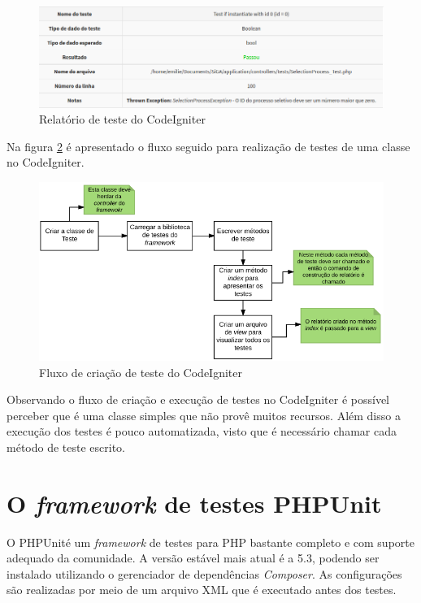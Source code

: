 \begin{figure}[!h]
\centering
\includegraphics[scale=0.7]{figuras/relatorio_codeigniter.png}
\caption{Relatório de teste do CodeIgniter}
\label{fig:relatorio_codeigniter}
\end{figure}

Na figura \ref{fig:fluxo_codeigniter} é apresentado o fluxo seguido para realização de testes de uma classe no CodeIgniter.

\begin{figure}[!h]
\centering
\includegraphics[scale=0.7]{figuras/fluxo_codeigniter.png}
\caption{Fluxo de criação de teste do CodeIgniter}
\label{fig:fluxo_codeigniter}
\end{figure}

Observando o fluxo de criação e execução de testes no CodeIgniter é possível perceber que é uma classe simples que não provê muitos recursos. Além disso a execução dos testes é pouco automatizada, visto que é necessário chamar cada método
de teste escrito. 

\vfill
\pagebreak


\section{O \textit{framework} de testes PHPUnit}

  O PHPUnit\footnotemark  é um \textit{framework} de testes para PHP bastante completo e com suporte adequado
  da comunidade. A versão estável mais atual é a 5.3, podendo ser instalado utilizando o gerenciador
  de dependências \textit{Composer}. As configurações são realizadas por meio de um arquivo XML que é 
  executado antes dos testes.
  

